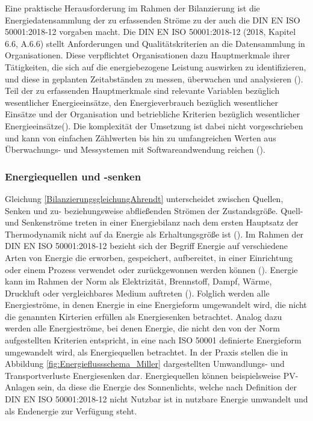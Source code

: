 Eine praktische Herausforderung im Rahmen der Bilanzierung ist die Energiedatensammlung der zu erfassenden Ströme zu der auch die DIN EN ISO 50001:2018-12 vorgaben macht. 
Die DIN EN ISO 50001:2018-12 (2018, Kapitel 6.6, A.6.6) stellt Anforderungen und Qualitätskriterien an die Datensammlung in Organisationen.
Diese verpflichtet Organisationen dazu Hauptmerkmale ihrer Tätigkeiten, die sich auf die energiebezogene Leistung auswirken zu identifizieren, und diese in geplanten 
Zeitabständen zu messen, überwachen und analysieren (\cite[S. 23]{DIN50001.2018}).
Teil der zu erfassenden Hauptmerkmale sind relevante Variablen bezüglich wesentlicher Energieeinsätze, den Energieverbrauch bezüglich wesentlicher Einsätze 
und der Organisation und betriebliche Kriterien bezüglich wesentlicher Energieeinsätze(\cite[S. 23]{DIN50001.2018}).
Die komplexität der Umsetzung ist dabei nicht vorgeschrieben und kann von einfachen Zählwerten bis hin zu umfangreichen Werten aus Überwachungs- und Messystemen mit 
Softwareandwendung reichen (\cite[S. 36]{DIN50001.2018}).


\subsubsection{Energiequellen und -senken}
Gleichung \eqref{BilanzierungsgleichungAhrendt} unterscheidet zwischen Quellen, Senken und zu- beziehungsweise abfließenden Strömen der Zustandsgröße. 
Quell- und Senkenströme treten in einer Energiebilanz nach dem ersten Hauptsatz der Thermodynamik nicht auf da Energie als Erhaltungsgröße ist (\cite[S. 14]{Ahrendts.2014}). 
Im Rahmen der DIN EN ISO 50001:2018-12 bezieht sich der Begriff Energie auf verschiedene Arten von Energie die erworben, gespeichert, aufbereitet, in einer Einrichtung oder einem Prozess verwendet 
oder zurückgewonnen werden können (\cite[Kapitel 3.5.1]{DIN50001.2018}). Energie kann im Rahmen der Norm als Elektrizität, Brennstoff, Dampf, Wärme, Druckluft oder vergleichbares Medium auftreten 
(\cite[Kapitel 3.5.1]{DIN50001.2018}).
Folglich werden alle Energieströme, in denen Energie in eine Energieform umgewandelt wird, die nicht die genannten Kirterien erfüllen als Energiesenken betrachtet. 
Analog dazu werden alle Energieströme, bei denen Energie, die nicht den von der Norm aufgestellten Kriterien entspricht, in eine nach ISO 50001 definierte Energieform 
umgewandelt wird, als Energiequellen betrachtet.
In der Praxis stellen die in Abbildung \eqref{fig:Energieflussschema_Miller} dargestellten Umwandlungs- und Transportverluste Energiesenken dar. Energiequellen können beispielsweise 
PV-Anlagen sein, da diese die Energie des Sonnenlichts, welche nach Definition der DIN EN ISO 50001:2018-12 nicht Nutzbar ist in nutzbare Energie umwandelt und als 
Endenergie zur Verfügung steht.

